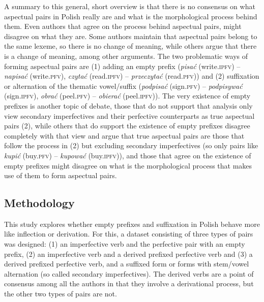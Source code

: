 \documentclass[12pt]{article}
\newcommand{\ita}[1]{\textit{#1}}
\begin{document}
A summary to this general, short overview is that there is no consensus on what aspectual pairs in Polish really are and what is the morphological process behind them. Even authors that agree on the process behind aspectual pairs, might disagree on what they are. Some authors maintain that aspectual pairs belong to the same lexeme, so there is no change of meaning, while others argue that there is a change of meaning, among other arguments. The two problematic ways of forming aspectual pairs are (1) adding an empty prefix (\textit{pisać} (write.\textsc{ipfv}) -- \textit{napisać} (write.\textsc{pfv}), \ita{czytać} (read.\textsc{ipfv}) -- \ita{przeczytać} (read.\textsc{pfv}))  and (2) suffixation or alternation of the thematic vowel/suffix (\ita{podpisać} (sign.\textsc{pfv}) -- \ita{podpisywać} (sign.\textsc{ipfv}), \ita{obrać} (peel.\textsc{pfv}) -- \ita{obierać} (peel.\textsc{ipfv})). The very existence of empty prefixes is another topic of debate, those that do not support that analysis only view secondary imperfectives and their perfective counterparts as true aspectual pairs (2), while others that do support the existence of empty prefixes disagree completely with that view and argue that true aspectual pairs are those that follow the process in (2) but excluding secondary imperfectives (so only pairs like \textit{kupić} (buy.\textsc{pfv}) -- \textit{kupować} (buy.\textsc{ipfv})), and those that agree on the existence of empty prefixes might disagree on what is the morphological process that makes use of them to form aspectual pairs.

\subsection{Methodology} \label{methodology2}

This study explores whether empty prefixes and suffixation in Polish behave more like inflection or derivation. For this, a dataset consisting of three types of pairs was designed: (1) an imperfective verb and the perfective pair with an empty prefix, (2) an imperfective verb and a derived prefixed perfective verb and (3) a derived prefixed perfective verb, and a suffixed form or forms with stem/vowel alternation (so called secondary imperfectives). The derived verbs are a point of consensus among all the authors in that they involve a derivational process, but the other two types of pairs are not.
\end{document}
